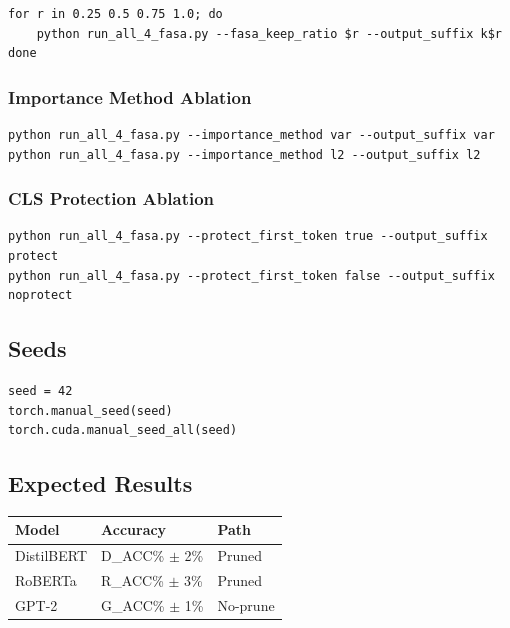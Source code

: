 \begin{lstlisting}
for r in 0.25 0.5 0.75 1.0; do
    python run_all_4_fasa.py --fasa_keep_ratio $r --output_suffix k$r
done
\end{lstlisting}

\subsubsection{Importance Method Ablation}

\begin{lstlisting}
python run_all_4_fasa.py --importance_method var --output_suffix var
python run_all_4_fasa.py --importance_method l2 --output_suffix l2
\end{lstlisting}

\subsubsection{CLS Protection Ablation}

\begin{lstlisting}
python run_all_4_fasa.py --protect_first_token true --output_suffix protect
python run_all_4_fasa.py --protect_first_token false --output_suffix noprotect
\end{lstlisting}

\subsection{Seeds}

\begin{lstlisting}
seed = 42
torch.manual_seed(seed)
torch.cuda.manual_seed_all(seed)
\end{lstlisting}

\subsection{Expected Results}

\begin{table}[H]
\centering
\small
\begin{tabular}{lll}
\toprule
\textbf{Model} & \textbf{Accuracy} & \textbf{Path} \\
\midrule
DistilBERT & {{D\_ACC}}\% $\pm$ 2\% & Pruned \\
RoBERTa & {{R\_ACC}}\% $\pm$ 3\% & Pruned \\
GPT-2 & {{G\_ACC}}\% $\pm$ 1\% & No-prune \\
\bottomrule
\end{tabular}
\end{table}

